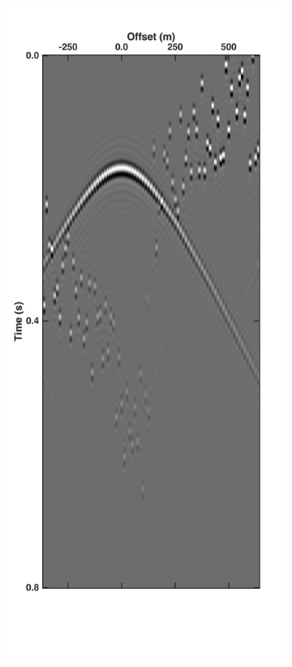 \begin{figure}
	\centering
	\begin{subfigure}[t]{0.25\textwidth}
		\includegraphics[width=\textwidth]{Plots/Mahdad/1iter/DeblendedCRG_rec30}	

\end{subfigure}
\end{figure}
